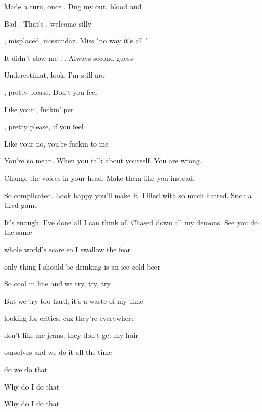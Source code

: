 

\zs
 Made a  turn, once . Dug my  out, blood and 

Bad . That's , welcome  silly 

, misplaced, missundaz. Miss "no way it's all "

It didn't slow me . . Always second guess

Underestimat, look, I'm still aro
\ks

\zr
{}, pretty please. Don't you  feel

Like your , fuckin' per

, pretty please, if you  feel

Like your no, you're fuckin  to me
\kr

\zs
You're so mean. When you talk about yourself. You are wrong. 

Change the voices in your head. Make them like you instead.

So complicated. Look happy you'll make it. Filled with so much hatred. Such a tired game

It's enough. I've done all I can think of. Chased down all my demons. See you do the same
\ks

\zr
\kr

\zs
{} whole world's scare so I swallow the fear

 only thing I should be drinking is an ice cold beer

So cool in line and we try, try, try

But we try too hard, it's a waste of my time

 looking for critics, cuz they're everywhere

 don't like me jeans, they don't get my hair

 ourselves and we do it all the time

 do we do that

Why do I do that

Why do I do that
\ks

\zr \kr

\kp